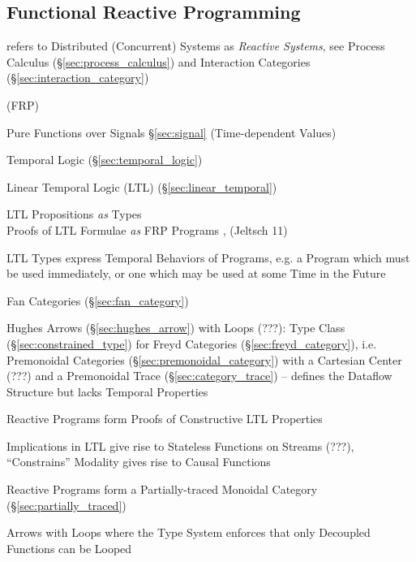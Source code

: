 \subsection{Functional Reactive Programming}\label{sec:frp}


\fist \cite{winskel-nielsen93} refers to Distributed (Concurrent)
Systems as \emph{Reactive Systems}, see Process Calculus
(\S\ref{sec:process_calculus}) and Interaction Categories
(\S\ref{sec:interaction_category})

(FRP)

Pure Functions over Signals \S\ref{sec:signal} (Time-dependent Values)

Temporal Logic (\S\ref{sec:temporal_logic})

Linear Temporal Logic (LTL) (\S\ref{sec:linear_temporal})

LTL Propositions \emph{as} Types \\
Proofs of LTL Formulae \emph{as} FRP Programs \cite{jeffrey12},
(Jeltsch 11)

LTL Types express Temporal Behaviors of Programs, e.g. a Program which
must be used immediately, or one which may be used at some Time in the
Future \cite{jeffrey12} %

Fan Categories (\S\ref{sec:fan_category}) \cite{jeltsch12}

Hughes Arrows (\S\ref{sec:hughes_arrow}) with Loops (???): Type Class
(\S\ref{sec:constrained_type}) for Freyd Categories
(\S\ref{sec:freyd_category}), i.e. Premonoidal Categories
(\S\ref{sec:premonoidal_category}) with a Cartesian Center (???) and a
Premonoidal Trace (\S\ref{sec:category_trace}) -- defines the Dataflow
Structure but lacks Temporal Properties \cite{jeffrey12}

Reactive Programs form Proofs of Constructive LTL Properties
\cite{jeffrey12}

Implications in LTL give rise to Stateless Functions on Streams (???),
``Constrains'' Modality gives rise to Causal Functions
\cite{jeffrey12} %

Reactive Programs form a Partially-traced Monoidal Category
(\S\ref{sec:partially_traced}) \cite{jeffrey12}

Arrows with Loops where the Type System enforces that only Decoupled
Functions can be Looped \cite{jeffrey12}

